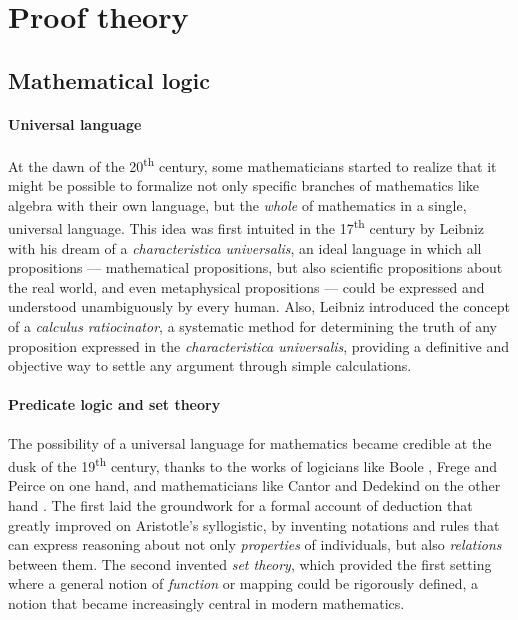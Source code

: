 \section{Proof theory}

\subsection{Mathematical logic}

\paragraph{Universal language}

At the dawn of the 20\textsuperscript{th} century, some mathematicians started
to realize that it might be possible to formalize not only specific branches of
mathematics like algebra with their own language, but the \emph{whole} of
mathematics in a single, universal language. This idea was first intuited in the
17\textsuperscript{th} century by Leibniz with his dream of a
\textit{characteristica universalis}, an ideal language in which all
propositions --- mathematical propositions, but also scientific propositions
about the real world, and even metaphysical propositions --- could be expressed
and understood unambiguously by every human. Also, Leibniz introduced the
concept of a \textit{calculus ratiocinator}, a systematic method for determining
the truth of any proposition expressed in the \textit{characteristica
universalis}, providing a definitive and objective way to settle any argument
through simple calculations.

\paragraph{Predicate logic and set theory}

The possibility of a universal language for mathematics became credible at the
dusk of the 19\textsuperscript{th} century, thanks to the works of logicians
like Boole , Frege  and Peirce
 on one hand, and mathematicians like Cantor and
Dedekind on the other hand . The
first laid the groundwork for a formal account of deduction that greatly
improved on Aristotle's syllogistic, by inventing notations and rules that can
express reasoning about not only \emph{properties} of individuals, but also
\emph{relations} between them. The second invented \emph{set theory}, which
provided the first setting where a general notion of \emph{function} or mapping
could be rigorously defined, a notion that became increasingly central in modern
mathematics.

